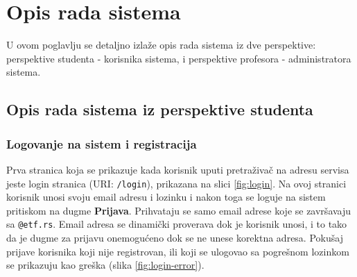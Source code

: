 \chapter{Opis rada sistema}\label{sistem}
U ovom poglavlju se detaljno izlaže opis rada sistema iz dve perspektive: perspektive studenta - korisnika sistema, i perspektive profesora - administratora sistema.

\section{Opis rada sistema iz perspektive studenta}
\subsection{Logovanje na sistem i registracija}
Prva stranica koja se prikazuje kada korisnik uputi pretraživač na adresu servisa jeste login stranica (URI: \texttt{/login}), prikazana na slici \ref{fig:login}. Na ovoj stranici korisnik unosi svoju email adresu i lozinku i nakon toga se loguje na sistem pritiskom na dugme \textbf{Prijava}. Prihvataju se samo email adrese koje se završavaju sa \texttt{@etf.rs}. Email adresa se dinamički proverava dok je korisnik unosi, i to tako da je dugme za prijavu onemogućeno dok se ne unese korektna adresa. Pokušaj prijave korisnika koji nije registrovan, ili koji se ulogovao sa pogrešnom lozinkom se prikazuju kao greška (slika \ref{fig:login-error}).

